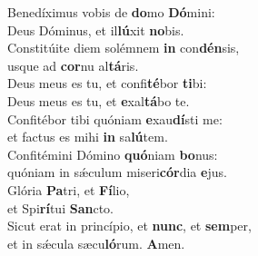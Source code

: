 \oddverse Benedíximus vobis de \textbf{do}mo \textbf{Dó}mini:~\*\\
\oddverse Deus Dóminus, et il\textbf{lú}xit \textbf{no}bis.\\
\evenverse Constitúite diem solémnem \textbf{in} con\textbf{dén}sis,~\*\\
\evenverse usque ad \textbf{cor}nu al\textbf{tá}ris.\\
\oddverse Deus meus es tu, et confi\textbf{té}bor \textbf{ti}bi:~\*\\
\oddverse Deus meus es tu, et \textbf{e}xal\textbf{tá}bo te.\\
\evenverse Confitébor tibi quóniam \textbf{e}xau\textbf{dí}sti me:~\*\\
\evenverse et factus es mihi \textbf{in} sa\textbf{lú}tem.\\
\oddverse Confitémini Dómino \textbf{quó}niam \textbf{bo}nus:~\*\\
\oddverse quóniam in sǽculum miseri\textbf{cór}dia \textbf{e}jus.\\
\evenverse Glória \textbf{Pa}tri, et \textbf{Fí}lio,~\*\\
\evenverse et Spi\textbf{rí}tui \textbf{San}cto.\\
\oddverse Sicut erat in princípio, et \textbf{nunc}, et \textbf{sem}per,~\*\\
\oddverse et in sǽcula sæcu\textbf{ló}rum. \textbf{A}men.\\

